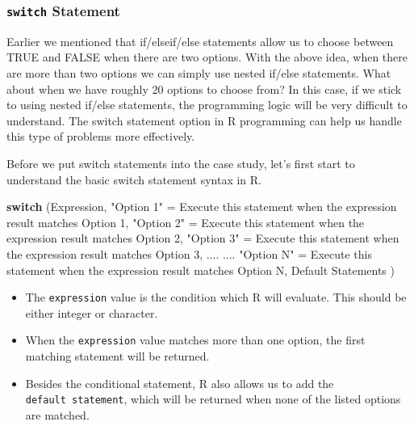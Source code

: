 \documentclass[12pt,]{krantz}
\newenvironment{Shaded}{\begin{snugshade}}{\end{snugshade}}
\newcommand{\DecValTok}[1]{\textcolor[rgb]{0.06,0.06,0.06}{#1}}
\newcommand{\StringTok}[1]{\textcolor[rgb]{0.5,0.5,0.5}{#1}}
\newcommand{\ControlFlowTok}[1]{\textcolor[rgb]{0.27,0.27,0.27}{\textbf{#1}}}
\newcommand{\NormalTok}[1]{#1}
\providecommand{\tightlist}{%
  \setlength{\itemsep}{0pt}\setlength{\parskip}{0pt}}
\begin{document}
\subsubsection{\texorpdfstring{\texttt{switch}
Statement}{switch Statement}}\label{switch-statement}

Earlier we mentioned that if/elseif/else statements allow us to choose
between TRUE and FALSE when there are two options. With the above idea,
when there are more than two options we can simply use nested if/else
statements. What about when we have roughly 20 options to choose from?
In this case, if we stick to using nested if/else statements, the
programming logic will be very difficult to understand. The switch
statement option in R programming can help us handle this type of
problems more effectively.

Before we put switch statements into the case study, let's first start
to understand the basic switch statement syntax in R.

\begin{Shaded}
\begin{Highlighting}[]
\ControlFlowTok{switch}\NormalTok{ (Expression,}
        \StringTok{"Option 1"}\NormalTok{ =}\StringTok{ }\NormalTok{Execute this statement when the expression result matches Option }\DecValTok{1}\NormalTok{,}
        \StringTok{"Option 2"}\NormalTok{ =}\StringTok{ }\NormalTok{Execute this statement when the expression result matches Option }\DecValTok{2}\NormalTok{,}
        \StringTok{"Option 3"}\NormalTok{ =}\StringTok{ }\NormalTok{Execute this statement when the expression result matches Option }\DecValTok{3}\NormalTok{,}
\NormalTok{        ....}
\NormalTok{        ....}
        \StringTok{"Option N"}\NormalTok{ =}\StringTok{ }\NormalTok{Execute this statement when the expression result matches Option N,}
\NormalTok{        Default Statements}
\NormalTok{)}
\end{Highlighting}
\end{Shaded}

\begin{itemize}
\tightlist
\item
  The \texttt{expression} value is the condition which R will evaluate.
  This should be either integer or character.
\item
  When the \texttt{expression} value matches more than one option, the
  first matching statement will be returned.
\item
  Besides the conditional statement, R also allows us to add the
  \texttt{default\ statement}, which will be returned when none of the
  listed options are matched.
\end{itemize}
\end{document}
